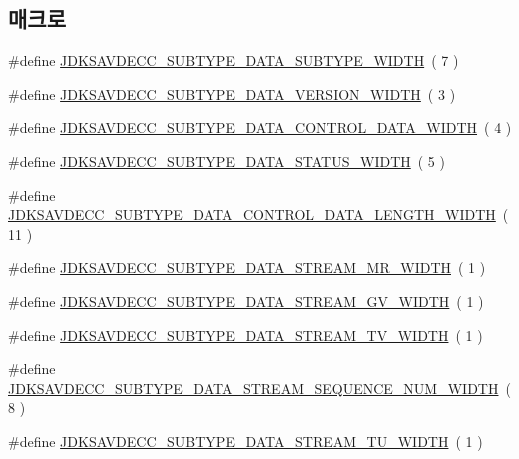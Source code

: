 \subsection*{매크로}
\begin{DoxyCompactItemize}
\item 
\#define \hyperlink{group__jdksavdecc__subtype__data_ga624227fd72dbec4cbec4f6436024fad8}{J\+D\+K\+S\+A\+V\+D\+E\+C\+C\+\_\+\+S\+U\+B\+T\+Y\+P\+E\+\_\+\+D\+A\+T\+A\+\_\+\+S\+U\+B\+T\+Y\+P\+E\+\_\+\+W\+I\+D\+TH}~( 7 )
\item 
\#define \hyperlink{group__jdksavdecc__subtype__data_ga97591e640a971dc293e1416455fb9ee3}{J\+D\+K\+S\+A\+V\+D\+E\+C\+C\+\_\+\+S\+U\+B\+T\+Y\+P\+E\+\_\+\+D\+A\+T\+A\+\_\+\+V\+E\+R\+S\+I\+O\+N\+\_\+\+W\+I\+D\+TH}~( 3 )
\item 
\#define \hyperlink{group__jdksavdecc__subtype__data_ga032f46118325ac56a0505490dff24963}{J\+D\+K\+S\+A\+V\+D\+E\+C\+C\+\_\+\+S\+U\+B\+T\+Y\+P\+E\+\_\+\+D\+A\+T\+A\+\_\+\+C\+O\+N\+T\+R\+O\+L\+\_\+\+D\+A\+T\+A\+\_\+\+W\+I\+D\+TH}~( 4 )
\item 
\#define \hyperlink{group__jdksavdecc__subtype__data_ga38a112978fe469b74b7541de23733f50}{J\+D\+K\+S\+A\+V\+D\+E\+C\+C\+\_\+\+S\+U\+B\+T\+Y\+P\+E\+\_\+\+D\+A\+T\+A\+\_\+\+S\+T\+A\+T\+U\+S\+\_\+\+W\+I\+D\+TH}~( 5 )
\item 
\#define \hyperlink{group__jdksavdecc__subtype__data_ga0bd033997c197fad16adfd5e24708935}{J\+D\+K\+S\+A\+V\+D\+E\+C\+C\+\_\+\+S\+U\+B\+T\+Y\+P\+E\+\_\+\+D\+A\+T\+A\+\_\+\+C\+O\+N\+T\+R\+O\+L\+\_\+\+D\+A\+T\+A\+\_\+\+L\+E\+N\+G\+T\+H\+\_\+\+W\+I\+D\+TH}~( 11 )
\item 
\#define \hyperlink{group__jdksavdecc__subtype__data_gab1a2166511af3c65661becd09840dfd4}{J\+D\+K\+S\+A\+V\+D\+E\+C\+C\+\_\+\+S\+U\+B\+T\+Y\+P\+E\+\_\+\+D\+A\+T\+A\+\_\+\+S\+T\+R\+E\+A\+M\+\_\+\+M\+R\+\_\+\+W\+I\+D\+TH}~( 1 )
\item 
\#define \hyperlink{group__jdksavdecc__subtype__data_ga3e6e149b97f7e699a91c0381e6d1fb97}{J\+D\+K\+S\+A\+V\+D\+E\+C\+C\+\_\+\+S\+U\+B\+T\+Y\+P\+E\+\_\+\+D\+A\+T\+A\+\_\+\+S\+T\+R\+E\+A\+M\+\_\+\+G\+V\+\_\+\+W\+I\+D\+TH}~( 1 )
\item 
\#define \hyperlink{group__jdksavdecc__subtype__data_gaeeffe15f0269a08c5769627d826582ca}{J\+D\+K\+S\+A\+V\+D\+E\+C\+C\+\_\+\+S\+U\+B\+T\+Y\+P\+E\+\_\+\+D\+A\+T\+A\+\_\+\+S\+T\+R\+E\+A\+M\+\_\+\+T\+V\+\_\+\+W\+I\+D\+TH}~( 1 )
\item 
\#define \hyperlink{group__jdksavdecc__subtype__data_ga1f7471f4282fb185f5e8c6d19a60cef8}{J\+D\+K\+S\+A\+V\+D\+E\+C\+C\+\_\+\+S\+U\+B\+T\+Y\+P\+E\+\_\+\+D\+A\+T\+A\+\_\+\+S\+T\+R\+E\+A\+M\+\_\+\+S\+E\+Q\+U\+E\+N\+C\+E\+\_\+\+N\+U\+M\+\_\+\+W\+I\+D\+TH}~( 8 )
\item 
\#define \hyperlink{group__jdksavdecc__subtype__data_ga1b98baf8f1102ed2b20b5305c050dfc7}{J\+D\+K\+S\+A\+V\+D\+E\+C\+C\+\_\+\+S\+U\+B\+T\+Y\+P\+E\+\_\+\+D\+A\+T\+A\+\_\+\+S\+T\+R\+E\+A\+M\+\_\+\+T\+U\+\_\+\+W\+I\+D\+TH}~( 1 )
\end{DoxyCompactItemize}
